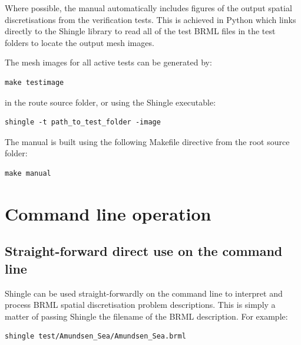 \documentclass[a4paper, 10pt]{book}
\providecommand{\shingle}{Shingle\xspace}
\providecommand{\brml}{BRML\xspace}
\begin{document}
\noindent
Where possible, the manual automatically
includes figures of the output spatial discretisations from the verification tests.
This is achieved in Python which links directly to the \shingle library to read all of the test \brml files in the test folders to locate the output mesh images.

\noindent
The mesh images for all active tests can be generated by:
\begin{verbatim}
make testimage
\end{verbatim}

\noindent
in the route source folder, or using the \shingle executable:
\begin{verbatim}
shingle -t path_to_test_folder -image
\end{verbatim}

\noindent
The manual is built using the following Makefile directive from the root source folder:
\begin{verbatim}
make manual
\end{verbatim}

\chapter{Command line operation}

\section{Straight-forward direct use on the command line}
\shingle can be used straight-forwardly on the command line to interpret and process \brml spatial discretisation problem descriptions.
This is simply a matter of passing \shingle the filename of the \brml description.
For example:
\begin{verbatim}
shingle test/Amundsen_Sea/Amundsen_Sea.brml
\end{verbatim}
\end{document}
